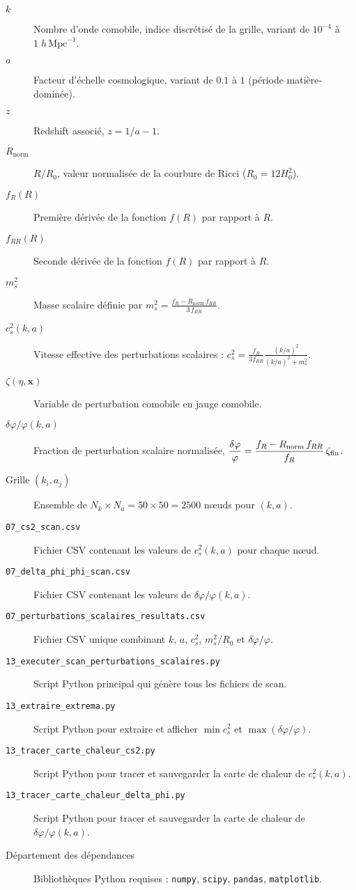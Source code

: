 \begin{description}
  \item[$k$] Nombre d’onde comobile, indice discrétisé de la grille, variant de $10^{-4}$ à $1\;h\,\mathrm{Mpc}^{-1}$.
  \item[$a$] Facteur d’échelle cosmologique, variant de $0.1$ à $1$ (période matière-dominée).
  \item[$z$] Redshift associé, $z = 1/a - 1$.
  \item[$R_{\mathrm{norm}}$] $R/R_{0}$, valeur normalisée de la courbure de Ricci ($R_{0}=12H_{0}^{2}$).
  \item[$f_{R}(R)$] Première dérivée de la fonction $f(R)$ par rapport à $R$.
  \item[$f_{RR}(R)$] Seconde dérivée de la fonction $f(R)$ par rapport à $R$.
  \item[$m_{s}^{2}$] Masse scalaire définie par 
    $\displaystyle m_{s}^{2}=\frac{f_{R}-R_{\mathrm{norm}}\,f_{RR}}{3\,f_{RR}}$.
  \item[$c_{s}^{2}(k,a)$] Vitesse effective des perturbations scalaires : 
    $\displaystyle c_{s}^{2}=\frac{f_{R}}{3f_{RR}}\frac{(k/a)^{2}}{(k/a)^{2}+m_{s}^{2}}$.
  \item[$\zeta(\eta,\mathbf{x})$] Variable de perturbation comobile en jauge comobile.
  \item[$\delta\varphi/\varphi(k,a)$] Fraction de perturbation scalaire normalisée,  
    $\displaystyle \frac{\delta\varphi}{\varphi}=\frac{f_{R}-R_{\mathrm{norm}}\,f_{RR}}{f_{R}}\,\zeta_{\rm fin}$.
  \item[Grille $(k_{i},a_{j})$] Ensemble de $N_{k}\times N_{a}=50\times50=2500$ nœuds pour $(k,a)$.
  \item[\texttt{07\_cs2\_scan.csv}] Fichier CSV contenant les valeurs de $c_{s}^{2}(k,a)$ pour chaque nœud.
  \item[\texttt{07\_delta\_phi\_phi\_scan.csv}] Fichier CSV contenant les valeurs de $\delta\varphi/\varphi(k,a)$.
  \item[\texttt{07\_perturbations\_scalaires\_resultats.csv}] Fichier CSV unique combinant $k$, $a$, $c_{s}^{2}$, $m_{s}^{2}/R_{0}$ et $\delta\varphi/\varphi$.
  \item[\texttt{13\_executer\_scan\_perturbations\_scalaires.py}] Script Python principal qui génère tous les fichiers de scan.
  \item[\texttt{13\_extraire\_extrema.py}] Script Python pour extraire et afficher $\min c_{s}^{2}$ et $\max(\delta\varphi/\varphi)$.
  \item[\texttt{13\_tracer\_carte\_chaleur\_cs2.py}] Script Python pour tracer et sauvegarder la carte de chaleur de $c_{s}^{2}(k,a)$.
  \item[\texttt{13\_tracer\_carte\_chaleur\_delta\_phi.py}] Script Python pour tracer et sauvegarder la carte de chaleur de $\delta\varphi/\varphi(k,a)$.
  \item[Département des dépendances]  
    Bibliothèques Python requises : \texttt{numpy}, \texttt{scipy}, \texttt{pandas}, \texttt{matplotlib}.
\end{description}


